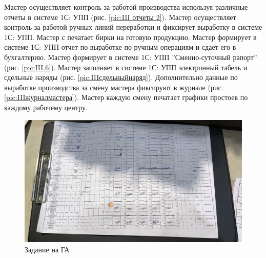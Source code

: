 Мастер осуществляет контроль за работой производства используя различные отчеты  в системе 1С: УПП (рис. \ref{pic:III отчеты 2}).
Мастер  осуществляет контроль за работой ручных линий переработки и фиксирует выработку в системе 1С: УПП. Мастер с печатает бирки на готовую продукцию.
Мастер формирует в системе 1С: УПП отчет по выработке по ручным операциям и сдает его в бухгалтерию. 
Мастер формирует в системе 1С: УПП ''Сменно-суточный рапорт'' (рис. \ref{pic:III.6}). 
Мастер заполняет в системе 1С: УПП электронный табель и сдельные наряды (рис. \ref{pic:IIIсдельныйнаряд}).
Дополнительно данные по выработке производства за смену мастера фиксируют в журнале (рис. \ref{pic:IIIжурналмастера}).
Мастер каждую смену печатает графики простоев по каждому рабочему центру.


\clearpage



\begin{figure}
\begin{center}
 \includegraphics[height=0.38\textheight, keepaspectratio]{Pics/V Задание на ГА.jpg}
\end{center}
 \caption{Задание на ГА}
 \label{pic:Задание на ГА}
\end{figure}

